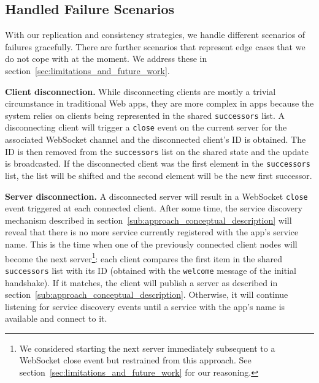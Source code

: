 \subsection{Handled Failure Scenarios}
\label{sub:approach_handled_failure_scenarios}

With our replication and consistency strategies, we handle different scenarios of failures gracefully. There are further scenarios that represent edge cases that we do not cope with at the moment. We address these in section~\ref{sec:limitations_and_future_work}.

\textbf{Client disconnection.} While disconnecting clients are mostly a trivial circumstance in traditional Web apps, they are more complex in \APIshort apps because the system relies on clients being represented in the shared \texttt{successors} list. A disconnecting client will trigger a \texttt{close} event on the current server for the associated WebSocket channel and the disconnected client's ID is obtained. The ID is then removed from the \texttt{successors} list on the shared state and the update is broadcasted. If the disconnected client was the first element in the \texttt{successors} list, the list will be shifted and the second element will be the new first successor.

\textbf{Server disconnection.} A disconnected server will result in a WebSocket \texttt{close} event triggered at each connected client. After some time, the service discovery mechanism described in section~\ref{sub:approach_conceptual_description} will reveal that there is no more service currently registered with the app's service name. This is the time when one of the previously connected client nodes will become the next server\footnote{We considered starting the next server immediately subsequent to a WebSocket close event but restrained from this approach. See section~\ref{sec:limitations_and_future_work} for our reasoning.}: each client compares the first item in the shared \texttt{successors} list with its ID (obtained with the \texttt{welcome} message of the initial handshake). If it matches, the client will publish a server as described in section~\ref{sub:approach_conceptual_description}. Otherwise, it will continue listening for service discovery events until a service with the app's name is available and connect to it.

